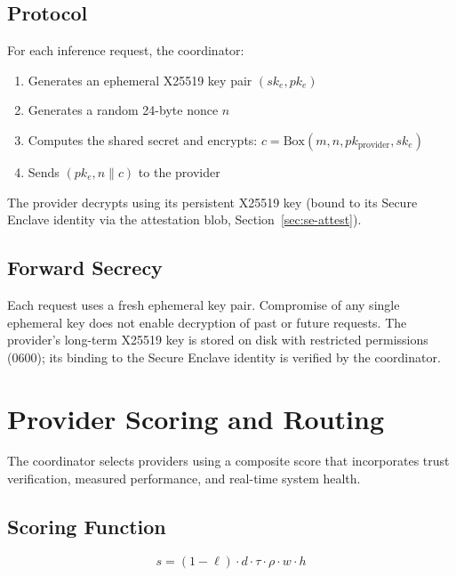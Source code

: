 \documentclass[10pt,twocolumn,letterpaper]{article}
\begin{document}
\subsection{Protocol}

For each inference request, the coordinator:
\begin{enumerate}[leftmargin=*,itemsep=1pt]
    \item Generates an ephemeral X25519 key pair $(sk_e, pk_e)$
    \item Generates a random 24-byte nonce $n$
    \item Computes the shared secret and encrypts: $c = \text{Box}(m, n, pk_{\text{provider}}, sk_e)$
    \item Sends $(pk_e, n \| c)$ to the provider
\end{enumerate}

The provider decrypts using its persistent X25519 key (bound to its Secure Enclave identity via the attestation blob, Section~\ref{sec:se-attest}).

\subsection{Forward Secrecy}

Each request uses a fresh ephemeral key pair. Compromise of any single ephemeral key does not enable decryption of past or future requests. The provider's long-term X25519 key is stored on disk with restricted permissions (0600); its binding to the Secure Enclave identity is verified by the coordinator.

\section{Provider Scoring and Routing}
\label{sec:scoring}

The coordinator selects providers using a composite score that incorporates trust verification, measured performance, and real-time system health.

\subsection{Scoring Function}

\begin{equation}
\label{eq:score}
s = (1 - \ell) \cdot d \cdot \tau \cdot \rho \cdot w \cdot h
\end{equation}
\end{document}
